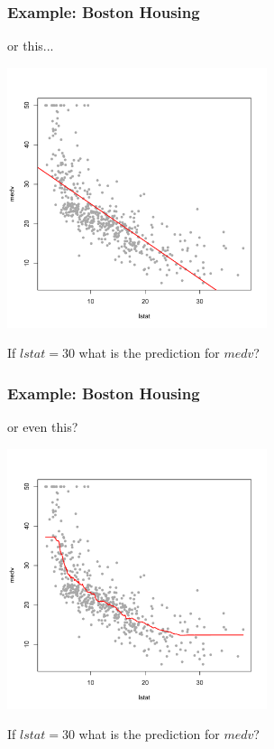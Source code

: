 \documentclass[flegn]{beamer}
\begin{document}
\begin{frame}
\frametitle{Example: Boston Housing}
or this...
\vspace{-0.8cm}
\begin{center}
\includegraphics[width=3in]{Boston3}
\end{center}

\vspace{-0.5cm}
{\color{red}If $lstat=30$ what is the prediction for $medv$?}
\end{frame}


\begin{frame}
\frametitle{Example: Boston Housing}
or even this?
\vspace{-0.8cm}
\begin{center}
\includegraphics[width=3in]{Boston4}
\end{center}

\vspace{-0.5cm}
{\color{red}If $lstat=30$ what is the prediction for $medv$?}
\end{frame}
\end{document}
